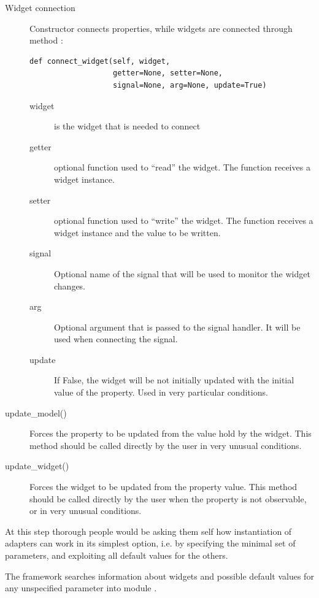 \begin{description}
\begin{description}
\end{description}

\item [Widget connection] Constructor connects properties, while
  widgets are connected through method :

{
\codesize
\begin{verbatim}
def connect_widget(self, widget,
                   getter=None, setter=None, 
                   signal=None, arg=None, update=True)
\end{verbatim}
}

\begin{description}

\item [widget] is the widget that is needed to connect
\item[getter] optional function used to ``read'' the
  widget. The function receives a widget instance.
\item[setter] optional function used to ``write'' the
  widget. The function receives a widget instance and the value to
  be written.
\item[signal] Optional name of the signal that will be used to
  monitor the widget changes.
\item[arg] Optional argument that is passed to the signal
  handler. It will be used when connecting the signal.
\item[update] If False, the widget will be not initially updated
  with the initial value of the property. Used in very particular
  conditions.
\end{description}

\item[update\_model()] Forces the property to be updated from the
  value hold by the widget. This method should be called directly by
  the user in very unusual conditions.

\item[update\_widget()] Forces the widget to be updated from the
  property value. This method should be called directly by the user
  when the property is not observable, or in very unusual conditions.

\end{description}


At this step thorough people would be asking them self how
instantiation of adapters can work in its simplest option, i.e. by
specifying the minimal set of parameters, and exploiting all default
values for the others.

The framework searches information about widgets and possible
default values for any unspecified parameter into module
.

